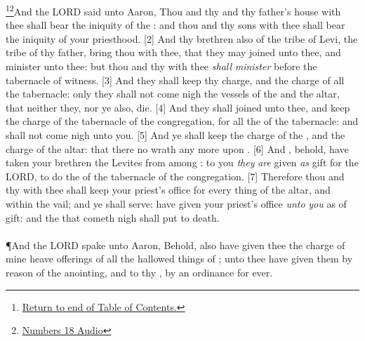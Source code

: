 \footnote{\textcolor[cmyk]{0.99998,1,0,0}{\hyperlink{TOC}{Return to end of Table of Contents.}}}\footnote{\href{https://audiobible.com/bible/numbers_18.html}{\textcolor[cmyk]{0.99998,1,0,0}{Numbers 18 Audio}}}\textcolor[cmyk]{0.99998,1,0,0}{And the LORD said unto Aaron, Thou and thy  and thy father's house with thee shall bear the iniquity of the : and thou and thy sons with thee shall bear the iniquity of your priesthood.}
[2] \textcolor[cmyk]{0.99998,1,0,0}{And thy brethren also of the tribe of Levi, the tribe of thy father, bring thou with thee, that they may  joined unto thee, and minister unto thee: but thou and thy  with thee \emph{shall} \emph{minister} before the tabernacle of witness.}
[3] \textcolor[cmyk]{0.99998,1,0,0}{And they shall keep thy charge, and the charge of all the tabernacle: only they shall not come nigh the vessels of the  and the altar, that neither they, nor ye also, die.}
[4] \textcolor[cmyk]{0.99998,1,0,0}{And they shall  joined unto thee, and keep the charge of the tabernacle of the congregation, for all the  of the tabernacle: and   shall not come nigh unto you.}
[5] \textcolor[cmyk]{0.99998,1,0,0}{And ye shall keep the charge of the , and the charge of the altar: that there  no wrath any more upon .}
[6] \textcolor[cmyk]{0.99998,1,0,0}{And , behold,  have taken your brethren the Levites from among : to you \emph{they} \emph{are} given \emph{as}  gift for the LORD, to do the  of the tabernacle of the congregation.}
[7] \textcolor[cmyk]{0.99998,1,0,0}{Therefore thou and thy  with thee shall keep your priest's office for every thing of the altar, and within the vail; and ye shall serve:  have given your priest's office \emph{unto} \emph{you} as   of gift: and the  that cometh nigh shall  put to death.}\\
\\
\P \textcolor[cmyk]{0.99998,1,0,0}{And the LORD spake unto Aaron, Behold,  also have given thee the charge of mine heave offerings of all the hallowed things of ; unto thee have  given them by reason of the anointing, and to thy , by an ordinance for ever.}
